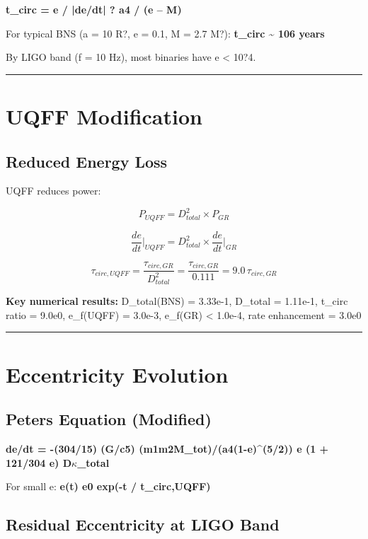 \documentclass[12pt,a4paper]{article}
\begin{document}
\textbf{t\_circ = e / |de/dt| ? a4 / (e -- M)}

For typical BNS (a = 10 R?, e = 0.1, M = 2.7 M?): \textbf{t\_circ \textasciitilde{} 106 years}

By LIGO band (f = 10 Hz), most binaries have e < 10?4.

\medskip\hrule\medskip

\section{UQFF Modification}

\subsection{Reduced Energy Loss}

UQFF reduces power:

\begin{equation}
P_{UQFF} = D^2_{total} \times P_{GR}
\end{equation}

\begin{equation}
\frac{de}{dt}\bigg|_{UQFF} = D^2_{total} \times \frac{de}{dt}\bigg|_{GR}
\end{equation}

\begin{equation}
\tau_{circ,UQFF} = \frac{\tau_{circ,GR}}{D^2_{total}} = \frac{\tau_{circ,GR}}{0.111} = 9.0\,\tau_{circ,GR}
\end{equation}

\textbf{Key numerical results:} D\_total(BNS) = 3.33e-1, D\_total = 1.11e-1, t\_circ ratio = 9.0e0, e\_f(UQFF) = 3.0e-3, e\_f(GR) < 1.0e-4, rate enhancement = 3.0e0

\medskip\hrule\medskip

\section{Eccentricity Evolution}

\subsection{Peters Equation (Modified)}

\textbf{de/dt = -(304/15) (G/c5) (m1m2M\_tot)/(a4(1-e)\^{}(5/2))  e  (1 + 121/304 e)  D$\kappa$\_total}

For small e: \textbf{e(t)  e0 exp(-t / t\_circ,UQFF)}

\subsection{Residual Eccentricity at LIGO Band}
\end{document}
